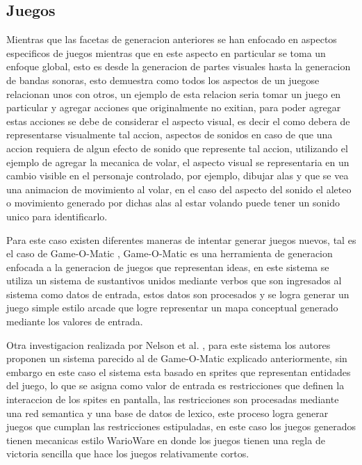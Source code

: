 \subsection{Juegos}
\label{subsection:games}

Mientras que las facetas de generacion anteriores se han enfocado en aspectos
especificos de juegos mientras que en este aspecto en particular se toma un
enfoque global, esto es desde la generacion de partes visuales hasta la 
generacion de bandas sonoras, esto demuestra como todos los aspectos de un
juegose relacionan unos con otros, un ejemplo de esta relacion seria tomar un
juego en particular y agregar acciones que originalmente no exitian, para poder
agregar estas acciones se debe de considerar el aspecto visual, es decir el como
debera de representarse visualmente tal accion, aspectos de sonidos en caso de
que una accion requiera de algun efecto de sonido que represente tal accion,
utilizando el ejemplo de agregar la mecanica de volar, el aspecto visual se
representaria en un cambio visible en el personaje controlado, por ejemplo,
dibujar alas y que se vea una animacion de movimiento al volar, en el caso del
aspecto del sonido el aleteo o movimiento generado por dichas alas al estar
volando puede tener un sonido unico para identificarlo.

Para este caso existen diferentes maneras de intentar generar juegos nuevos, tal
es el caso de Game-O-Matic \cite{treanor2012game}, Game-O-Matic es una
herramienta de generacion enfocada a la generacion de juegos que representan
ideas, en este sistema se utiliza un sistema de sustantivos unidos mediante
verbos que son ingresados al sistema como datos de entrada, estos datos son
procesados y se logra generar un juego simple estilo arcade que logre
representar un mapa conceptual generado mediante los valores de entrada. 

Otra investigacion realizada por Nelson et al. \cite{Nelson2008}, para este
sistema los autores proponen un sistema parecido al de Game-O-Matic explicado
anteriormente, sin embargo en este caso el sistema esta basado en sprites que
representan entidades del juego, lo que se asigna como valor de entrada es
restricciones que definen la interaccion de los spites en pantalla, las
restricciones son procesadas mediante una red semantica y una base de datos de
lexico, este proceso logra generar juegos que cumplan las restricciones
estipuladas, en este caso los juegos generados tienen mecanicas estilo WarioWare
en donde los juegos tienen una regla de victoria sencilla que hace los juegos
relativamente cortos. 


